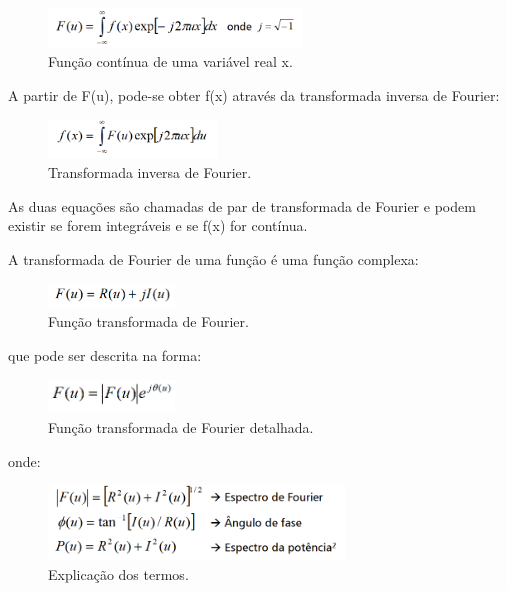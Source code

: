 \documentclass{article}
\begin{document}
     \begin{figure}[H]
        \centering
        \includegraphics[width=0.6\textwidth]{template/img/fig11.png}
        \caption{Função contínua de uma variável real x.}
        \label{fig:fig11}
    \end{figure}
    
    A partir de F(u), pode-se obter f(x) através da transformada inversa de Fourier:
    
     \begin{figure}[H]
        \centering
        \includegraphics[width=0.4\textwidth]{template/img/fig12.png}
        \caption{Transformada inversa de Fourier.}
        \label{fig:fig12}
    \end{figure}
    
    As  duas  equações  são  chamadas  de  par  de transformada de Fourier e podem existir se forem integráveis e se f(x) for contínua.
    
    A transformada de Fourier de uma função é uma função complexa:
    
    \begin{figure}[H]
        \centering
        \includegraphics[width=0.3\textwidth]{template/img/fig13.png}
        \caption{Função transformada de Fourier.}
        \label{fig:fig13}
    \end{figure}
    
    que pode ser descrita na forma: 
    
    \begin{figure}[H]
        \centering
        \includegraphics[width=0.3\textwidth]{template/img/fig14.png}
        \caption{Função transformada de Fourier detalhada.}
        \label{fig:fig14}
    \end{figure}
    
    onde: 
    
     \begin{figure}[H]
        \centering
        \includegraphics[width=0.7\textwidth]{template/img/fig15.png}
        \caption{Explicação dos termos.}
        \label{fig:fig15}
    \end{figure}
    
\end{document}
